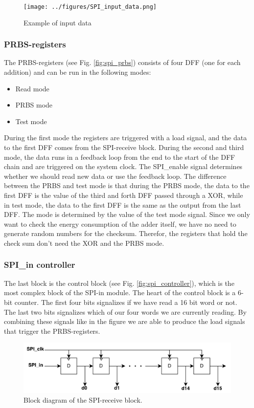 \begin{figure}[H]
	\centering
	\captionsetup{justification=centering}
	\texttt{[image: ../figures/SPI\_input\_data.png]}
	\caption{Example of input data} \label{fig:spi_input_data}
\end{figure}

\subsubsection{PRBS-registers}
The PRBS-registers (see Fig. \ref{fig:spi_prbs}) consists of four DFF (one for each addition) and can be run in the following modes:
\begin{itemize}
	\item Read mode
	\item PRBS mode
	\item Test mode
\end{itemize}
 During the first mode the registers are triggered with a load signal, and the data to the first DFF comes from the SPI-receive block. During the second and third mode, the data runs in a feedback loop from the end to the start of the DFF chain and are triggered on the system clock. The SPI\_enable signal determines whether we should read new data or use the feedback loop. The difference between the PRBS and test mode is that during the PRBS mode, the data to the first DFF is the value of the third and forth DFF passed through a XOR, while in test mode, the data to the first DFF is the same as the output from the last DFF. The mode is determined by the value of the test mode signal. Since we only want to check the energy consumption of the adder itself, we have no need to generate random numbers for the checksum. Therefor, the registers that hold the check sum don't need the XOR and the PRBS mode.
 
\subsubsection{SPI\_in controller}
The last block is the control block (see Fig. \ref{fig:spi_controller}), which is the most complex block of the SPI-in module. The heart of the control block is a 6-bit counter. The first four bits signalizes if we have read a 16 bit word or not. The last two bits signalizes which of our four words we are currently reading. By combining these signals like in the figure we are able to produce the load signals that trigger the PRBS-registers.

\begin{figure}[H]
	\centering
	\captionsetup{justification=centering}
	\includegraphics[scale=0.5]{../figures/SPI_receive.pdf}
	\caption{Block diagram of the SPI-receive block.} \label{fig:spi_receive}
\end{figure}

